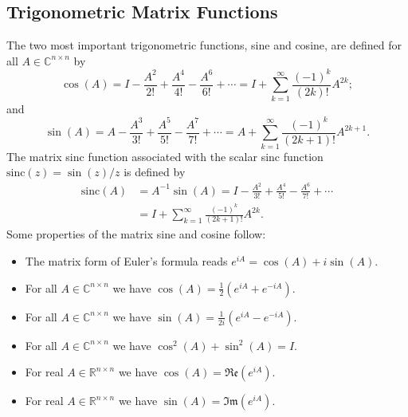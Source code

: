 \subsection{Trigonometric Matrix Functions}
\label{sec:trigonometricmatrixfunctions}

The two most important trigonometric functions, sine and cosine, are defined
\cite{higham2008functions} for all $A \in \mathbb{C}^{n \times n}$ by
\begin{equation}
    \label{eq:matrixcosinedefinition}
    \cos(A) = I - \frac{A^2}{2!} + \frac{A^4}{4!} - \frac{A^6}{6!} + \cdots
    = I + \sum_{k=1}^{\infty}{\frac{(-1)^k}{(2k)!} A^{2k}};
\end{equation}
and
\begin{equation}
    \label{eq:matrixsinedefinition}
    \sin(A) = A - \frac{A^3}{3!} + \frac{A^5}{5!} - \frac{A^7}{7!} + \cdots
    = A + \sum_{k=1}^{\infty}{\frac{(-1)^k}{(2k+1)!} A^{2k+1}}.
\end{equation}
The matrix sinc function associated with the scalar sinc function
$\mathrm{sinc}(z) = \sin(z) / z$ is defined by
\begin{equation}
    \label{eq:matrixsincdefinition}
    \begin{aligned}
        \mathrm{sinc}(A) & = A^{-1} \sin(A)
        = I - \frac{A^2}{3!} + \frac{A^4}{5!} - \frac{A^6}{7!} + \cdots \\
        & = I + \sum_{k=1}^{\infty}{\frac{(-1)^k}{(2k+1)!} A^{2k}}.
    \end{aligned}
\end{equation}
Some properties of the matrix sine and cosine follow:
\begin{itemize}
    \item The matrix form of Euler's formula reads $e^{iA} = \cos(A) + i \sin(A)$.
    \item For all $A \in \mathbb{C}^{n \times n}$ we have $\cos(A) = \frac{1}{2} (e^{iA} + e^{-iA})$.
    \item For all $A \in \mathbb{C}^{n \times n}$ we have $\sin(A) = \frac{1}{2i} (e^{iA} - e^{-iA})$.
    \item For all $A \in \mathbb{C}^{n \times n}$ we have $\cos^2(A) + \sin^2(A) = I$.
    \item For real $A \in \mathbb{R}^{n \times n}$ we have $\cos(A) = \mathfrak{Re}(e^{iA})$.
    \item For real $A \in \mathbb{R}^{n \times n}$ we have $\sin(A) = \mathfrak{Im}(e^{iA})$.
\end{itemize}

